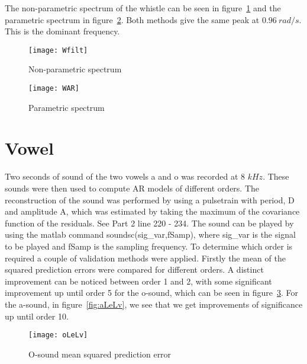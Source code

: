 \documentclass[10pt]{article}
\begin{document}
The non-parametric spectrum of the whistle can be seen in figure~\ref{fig:Wfilt}
and the parametric spectrum in figure~\ref{fig:WAR}. Both methods give the same peak
at $0.96~rad/s$. This is the dominant frequency.


\begin{figure}[!hp]

    \begin{center}
      \texttt{[image: Wfilt]}
    \caption{Non-parametric spectrum \label{fig:Wfilt}}
    \end{center}

\end{figure}

\begin{figure}[!hp]

    \begin{center}
      \texttt{[image: WAR]}
    \caption{Parametric spectrum \label{fig:WAR}}
    \end{center}

\end{figure}

\clearpage

\section{Vowel}
Two seconds of sound of the two vowels a and o was recorded at
8 $kHz$. These sounds were then used to compute AR models of
different orders.
The reconstruction of the sound was performed by using a pulsetrain with period,
D and amplitude A, which was estimated by taking the maximum of the covariance function
of the residuals. See Part 2 line 220 - 234. The sound can be played by using the
 matlab command soundsc(sig_var,fSamp), where sig_var is the signal to be played
 and fSamp is the sampling frequency.
To determine which order is required a couple of validation
methods were applied. Firstly the mean of the squared prediction errors were compared for different
orders. A distinct improvement can be noticed between order 1 and 2, with some
significant improvement up until order 5 for the o-sound, which can be seen in
figure~\ref{fig:oLeLv}. For the a-sound, in figure~\ref{fig:aLeLv}, we see that
 we get improvements of significance up until order 10.


\begin{figure}[!hp]

    \begin{center}
      \texttt{[image: oLeLv]}
    \caption{O-sound mean squared prediction error \label{fig:oLeLv}}
    \end{center}

\end{figure}
\end{document}
